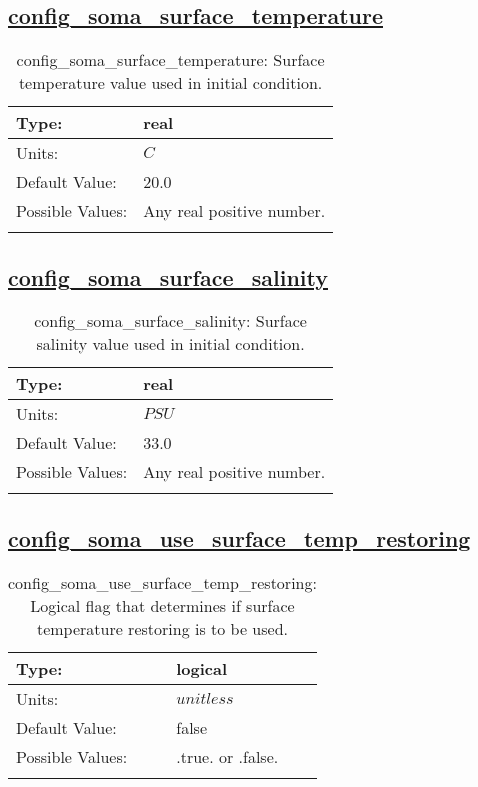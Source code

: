 \subsection[config\_soma\_surface\_temperature]{\hyperref[sec:nm_tab_soma]{config\_soma\_surface\_temperature}}
\label{subsec:nm_sec_config_soma_surface_temperature}
\begin{center}
\begin{longtable}{| p{2.0in} || p{4.0in} |}
    \hline
    Type: & real \\
    \hline
    Units: & $C$ \\
    \hline
    Default Value: & 20.0 \\
    \hline
    Possible Values: & Any real positive number. \\
    \hline
    \caption{config\_soma\_surface\_temperature: Surface temperature value used in initial condition.}
\end{longtable}
\end{center}
\subsection[config\_soma\_surface\_salinity]{\hyperref[sec:nm_tab_soma]{config\_soma\_surface\_salinity}}
\label{subsec:nm_sec_config_soma_surface_salinity}
\begin{center}
\begin{longtable}{| p{2.0in} || p{4.0in} |}
    \hline
    Type: & real \\
    \hline
    Units: & $PSU$ \\
    \hline
    Default Value: & 33.0 \\
    \hline
    Possible Values: & Any real positive number. \\
    \hline
    \caption{config\_soma\_surface\_salinity: Surface salinity value used in initial condition.}
\end{longtable}
\end{center}
\subsection[config\_soma\_use\_surface\_temp\_restoring]{\hyperref[sec:nm_tab_soma]{config\_soma\_use\_surface\_temp\_restoring}}
\label{subsec:nm_sec_config_soma_use_surface_temp_restoring}
\begin{center}
\begin{longtable}{| p{2.0in} || p{4.0in} |}
    \hline
    Type: & logical \\
    \hline
    Units: & $unitless$ \\
    \hline
    Default Value: & false \\
    \hline
    Possible Values: & .true. or .false. \\
    \hline
    \caption{config\_soma\_use\_surface\_temp\_restoring: Logical flag that determines if surface temperature restoring is to be used.}
\end{longtable}
\end{center}
